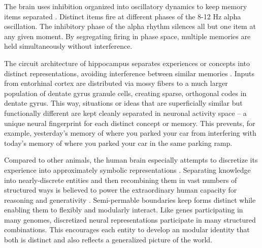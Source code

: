 \documentclass[12pt]{article}
\begin{document}

The brain uses inhibition organized into oscillatory dynamics to keep memory items separated \citep{lisman2013theta, jensen2010shaping, roux2014working, klimesch2007eeg}. Distinct items fire at different phases of the 8-12 Hz alpha oscillation. The inhibitory phase of the alpha rhythm silences all but one item at any given moment. By segregating firing in phase space, multiple memories are held simultaneously without interference. 

The circuit architecture of hippocampus separates experiences or concepts into distinct representations, avoiding interference between similar memories \citep{mcclelland1995why, marr1971simple, mcnaughton1987hippocampal, treves1994computational, muller1987effects, leutgeb2007pattern, colgin2008frequency}. Inputs from entorhinal cortex are distributed via mossy fibers to a much larger population of dentate gyrus granule cells, creating sparse, orthogonal codes in dentate gyrus. This way, situations or ideas that are superficially similar but functionally different are kept cleanly separated in neuronal activity space -- a unique neural fingerprint for each distinct concept or memory. This prevents, for example, yesterday's memory of where you parked your car from interfering with today's memory of where you parked your car in the same parking ramp. 

Compared to other animals, the human brain especially attempts to discretize its experience into approximately symbolic representations \citep{dehaene2022symbols, touretzky1988distributed, smolensky1990tensor, behrens2018cognitive}. Separating knowledge into nearly-discrete entities and then recombining them in vast numbers of structured ways is believed to power the extraordinary human capacity for reasoning and generativity \citep{fodor1975language, pinker1994language, lake2015human, chomsky1957syntactic, kurth2023replay, schacter2007remembering}. Semi-permable boundaries keep forms distinct while enabling them to flexibly and modularly interact. Like genes participating in many genomes, discretized neural representations participate in many structured combinations. This encourages each entity to develop an modular identity that both is distinct and also reflects a generalized picture of the world.
\end{document}
